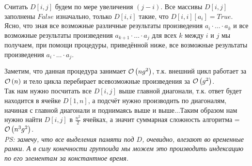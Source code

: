 Считать $D[i,j]$ будем по мере увеличения $(j-i)$. Все массивы
$D[i,j]$ заполнены $False$ изначально, только $D[i,i]$ такие, что $D[i,i][a_i]=True$.\\
Ясно, что зная все возможные различные результаты произведения $a_i\cdot \ldots \cdot a_k$ и все возможные результаты
произведения $a_{k+1}\cdot \ldots \cdot a_j$ для всех $k$ между $i$ и $j$ мы получаем, при помощи процедуры, приведённой
ниже, все возможные результаты произведения $a_{i}\cdot \ldots \cdot a_{j}$.\\
\newpage
\begin{algorithmic}[1]
			\EndIf
		\EndFor
	\EndFor
\EndFor
\end{algorithmic}

Заметим, что данная процедура занимает $\mathcal{O}\left(ng^2\right)$, т.к. внешний цикл работает за $\mathcal{O}\left(n\right)$ и тело цикла перебирает
всевозможные произведения за $\mathcal{O}\left(g^2\right)$.\\
Так нам нужно посчитать все $D[i,j]$ выше главной диагонали, т.к. ответ будет находится в ячейке $D[1,n]$, а подсчёт нужно производить по диагоналям, начиная с главной диагонали и поднимаясь выше и выше...Таким образом нам нужно найти $D[i,j]$
в $\frac{n^2}{2}$ ячейках, а значит суммарная сложность алгоритма = $\mathcal{O}\left(n^3g^2\right)$. \xqed
\\\textit{PS: замечу, что все выделения памяти под $D$, очевидно, влезают во временные рамки. А в силу конечности группоида
мы можем это производить индексацию по его элементам за константное время. }
